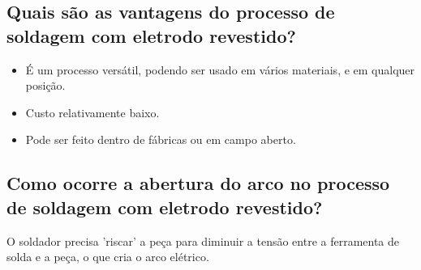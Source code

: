 \documentclass[a4paper, 12pt]{article}
\begin{document}
	\subsection{Quais são as vantagens do processo de soldagem com eletrodo revestido?}
	\begin{itemize}
		\item É um processo versátil, podendo ser usado em vários materiais, e em qualquer posição.
		\item Custo relativamente baixo.
		\item Pode ser feito dentro de fábricas ou em campo aberto.
	\end{itemize}
	
	\subsection{Como ocorre a abertura do arco no processo de soldagem com eletrodo revestido?}
	O soldador precisa 'riscar' a peça para diminuir a tensão entre a ferramenta de solda e a peça, o que cria o arco elétrico.
	
\end{document}
